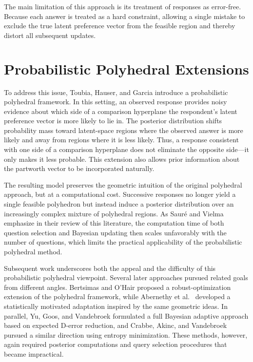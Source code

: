 \documentclass{article}
\begin{document}
The main limitation of this approach is its treatment of responses as
error-free. Because each answer is treated as a hard constraint, allowing a single mistake
to exclude the true latent preference vector from the feasible region and thereby
distort all subsequent updates.

\section{Probabilistic Polyhedral Extensions}
To address this issue, Toubia, Hauser, and Garcia \cite{probpoly} introduce a
probabilistic polyhedral framework. In this setting, an observed response provides
noisy evidence about which side of a comparison hyperplane the respondent's latent
preference vector is more likely to lie in.  The posterior distribution shifts probability mass toward latent-space regions where the observed answer is more likely and away from regions where it is less likely. Thus, a response consistent with one side of a comparison hyperplane
does not eliminate the opposite side---it only makes it less probable. This
extension also allows prior information about the partworth vector to be
incorporated naturally.

The resulting model preserves the geometric intuition of the original polyhedral
approach, but at a computational cost. Successive responses no longer yield a single feasible polyhedron but instead induce a posterior distribution over an increasingly complex mixture of polyhedral regions. 
As Saur\'e and Vielma emphasize in their review of this literature, the computation
time of both question selection and Bayesian updating then scales unfavorably with
the number of questions, which limits the practical applicability of the
probabilistic polyhedral method.

Subsequent work underscores both the appeal and the difficulty of this
probabilistic polyhedral viewpoint. Several later approaches pursued related goals
from different angles. Bertsimas and O'Hair \cite{bertsimas2013learning} proposed
a robust-optimization extension of the polyhedral framework, while Abernethy et
al.\ \cite{abernethy2008eliciting} developed a statistically motivated adaptation
inspired by the same geometric ideas. In parallel, Yu, Goos, and Vandebroek
\cite{yu2011individually} formulated a full Bayesian adaptive approach based on
expected D-error reduction, and Crabbe, Akinc, and Vandebroek
\cite{crabbe2014fast} pursued a similar direction using entropy minimization.
These methods, however, again required posterior computations and query selection
procedures that became impractical.
\end{document}
